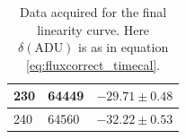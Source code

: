 \documentclass[../main.tex]{subfiles}
\begin{document}
\begin{table}[]
\begin{tabular}{|l|l|l|}
 			230                                                   & 64449                               & $-29.71 \pm 0.48$                                  \\ \hline
 			240                                                   & 64560                               & $-32.22 \pm 0.53$                                  \\ \hline
 		\end{tabular}
 		\caption{Data acquired for the final linearity curve. Here $\delta(\text{ADU})$ is as in equation \ref{eq:fluxcorrect_timecal}.}
 		\label{table:linearitydata}
 	\end{table}	
\end{document}
